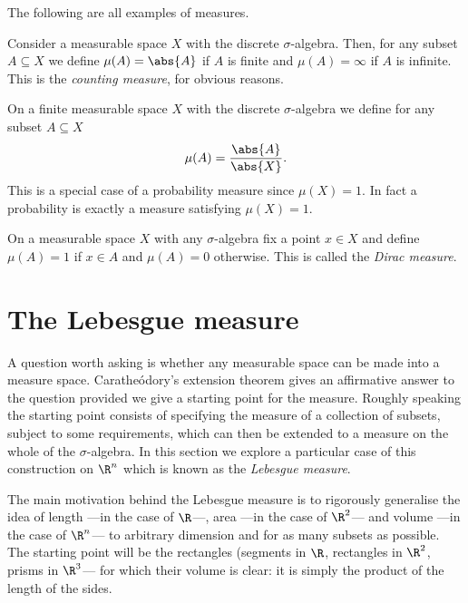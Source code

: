 \documentclass[12pt,oneside]{book}
\begin{document}
\begin{example}
	The following are all examples of measures.
	\begin{points}
	\item Consider a measurable space \( X \) with the discrete \( \sigma \)-algebra. Then, for any subset \( A \subseteq X \) we define \( \mu(A) = \abs{A} \) if \( A \) is finite and \( \mu(A) = \infty \) if \( A \) is infinite. This is the \emph{counting measure}, for obvious reasons.
	\item On a finite measurable space \( X \) with the discrete \( \sigma \)-algebra we define for any subset \( A \subseteq X \)
		\begin{equation*}
			\mu(A) = \frac{\abs{A}}{\abs{X}}.
		\end{equation*}
		This is a special case of a probability measure since \( \mu(X) = 1 \). In fact a probability is exactly a measure satisfying \( \mu(X) = 1 \).
	\item On a measurable space \( X \) with any \( \sigma \)-algebra fix a point \( x \in X \) and define \( \mu(A) = 1 \) if \( x \in A \) and \( \mu(A) = 0 \) otherwise. This is called the \emph{Dirac measure}.
	\end{points}
\end{example}

\chapter{The Lebesgue measure}
A question worth asking is whether any measurable space can be made into a measure space. Caratheódory's extension theorem gives an affirmative answer to the question provided we give a starting point for the measure. Roughly speaking the starting point consists of specifying the measure of a collection of subsets, subject to some requirements, which can then be extended to a measure on the whole of the \( \sigma \)-algebra. In this section we explore a particular case of this construction on \( \R^n \) which is known as the \emph{Lebesgue measure}.

The main motivation behind the Lebesgue measure is to rigorously generalise the idea of length ---in the case of \( \R \)---, area ---in the case of \( \R^2 \)--- and volume ---in the case of \( \R^n \)--- to arbitrary dimension and for as many subsets as possible. The starting point will be the rectangles (segments in \( \R \), rectangles in \( \R^2 \), prisms in \( \R^3 \)--- for which their volume is clear: it is simply the product of the length of the sides. 
\end{document}
